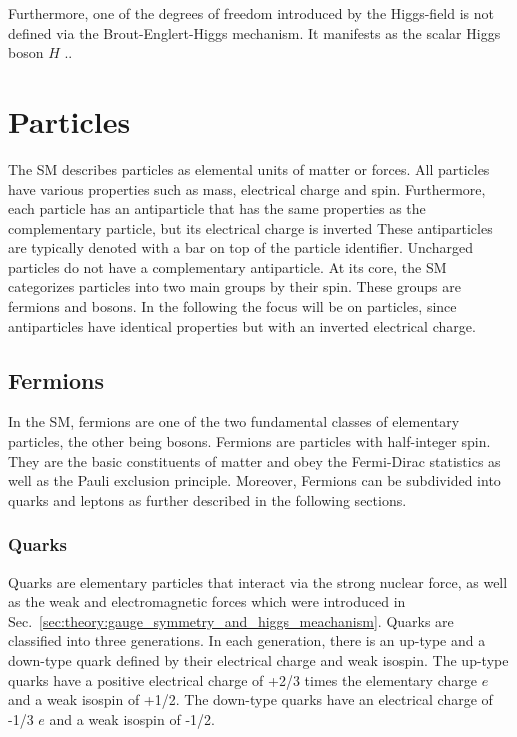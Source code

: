 \documentclass[bachelor,ngerman,english]{GAUBM}
\begin{document}
Furthermore, one of the degrees of freedom introduced by the Higgs-field is not defined via the Brout-Englert-Higgs mechanism. It manifests as the scalar Higgs boson $H$ \cite{theory:higgs_mechanism_01}..


\section{Particles}
\label{sec:theory:particles}
The SM describes particles as elemental units of matter or forces. All particles have various properties such as mass, electrical charge and spin. Furthermore, each particle has an antiparticle that has the same properties as the complementary particle, but its electrical charge is inverted These antiparticles are typically denoted with a bar on top of the particle identifier. Uncharged particles do not have a complementary antiparticle. At its core, the SM categorizes particles into two main groups by their spin. These groups are fermions and bosons. In the following the focus will be on particles, since antiparticles have identical properties but with an inverted electrical charge. 


\subsection*{Fermions}
In the SM, fermions are one of the two fundamental classes of elementary particles, the other being bosons. Fermions are particles with half-integer spin. They are the basic constituents of matter and obey the Fermi-Dirac statistics as well as the Pauli exclusion principle. Moreover, Fermions can be subdivided into quarks and leptons as further described in the following sections. 

\subsubsection*{Quarks}
Quarks are elementary particles that interact via the strong nuclear force, as well as the weak and electromagnetic forces which were introduced in Sec.~\ref{sec:theory:gauge_symmetry_and_higgs_meachanism}. Quarks are classified into three generations. In each generation, there is an up-type and a down-type quark defined by their electrical charge and weak isospin. The up-type quarks have a positive electrical charge of +2/3 times the elementary charge $e$ and a weak isospin of +1/2. The down-type quarks have an electrical charge of -1/3 $e$ and a weak isospin of -1/2. 
\end{document}
